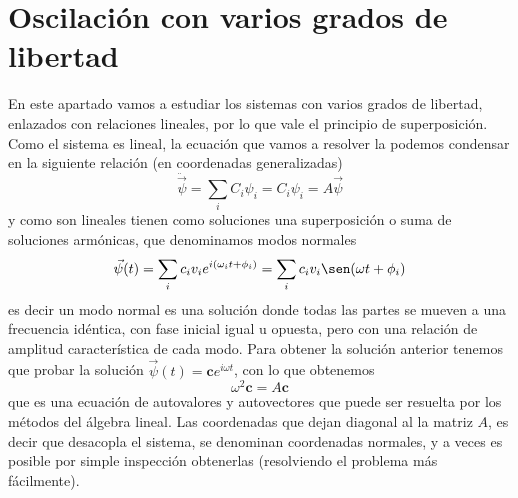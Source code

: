 \documentclass[a4paper]{article}
\numberwithin{equation}{section}
\begin{document}
\section{Oscilación con varios grados de libertad}
	En este apartado vamos a estudiar los sistemas con varios grados de libertad, enlazados con relaciones lineales, por lo que vale el principio de superposición. Como el sistema es lineal, la ecuación que vamos a resolver la podemos condensar en la siguiente relación (en coordenadas generalizadas)
    \begin{equation}
        \ddot{\vec{\psi}} = \sum_i C_i \psi_i = C_i \psi_i = A \vec{\psi}
        \label{eq:oscilador}
    \end{equation}
	y como son lineales tienen como soluciones una superposición o suma de soluciones armónicas, que denominamos modos normales
	\begin{equation}
		\vec{\psi}(t) = \sum_i c_i v_i e^{i (\omega_i t + \phi_i)} =  \sum_i c_i v_i \sen(\omega t + \phi_i)
		\label{eq:oscilador_solucion}
	\end{equation}
	es decir un modo normal es una solución donde todas las partes se mueven a una frecuencia idéntica, con fase inicial igual u opuesta, pero con una relación de amplitud característica de cada modo. Para obtener la solución anterior tenemos que probar la solución $\vec{\psi}(t) = \textbf{c} e^{i \omega t}$, con lo que obtenemos
	\begin{equation}
		\omega^2 \textbf{c} = A \textbf{c}
		\label{eq:oscilador_autovalores}
	\end{equation}
	que es una ecuación de autovalores y autovectores que puede ser resuelta por los métodos del álgebra lineal. Las coordenadas que dejan diagonal al la matriz $A$, es decir que desacopla el sistema, se denominan coordenadas normales, y a veces es posible por simple inspección obtenerlas (resolviendo el problema más fácilmente).
\end{document}

